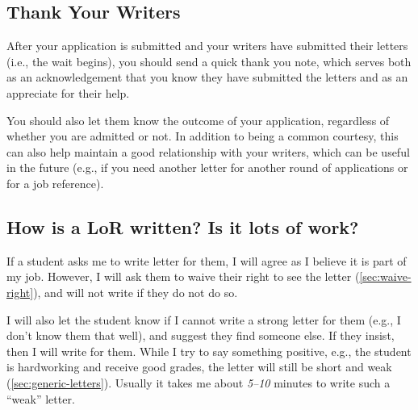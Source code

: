\documentclass[oneside,11pt,dvipsnames]{book}
\newenvironment{commentbox}[1][]{
  \small
  \begin{mybox}
    {\small \textbf{#1}}
  }{
  \end{mybox}
}
\begin{document}
\subsection{Thank Your Writers}\label{sec:thank-writers}
After your application is submitted and your writers have submitted their letters (i.e., the wait begins), you should send a quick thank you note, which serves both as an acknowledgement that you know they have submitted the letters and as an appreciate for their help.  

You should also let them know the outcome of your application, regardless of whether you are admitted or not.  In addition to being a common courtesy, this can also help maintain a good relationship with your writers, which can be useful in the future (e.g., if you need another letter for another round of applications or for a job reference).




\subsection{How is a LoR written? Is it lots of work?}\label{sec:lor-writing}

If a student asks me to write letter for them, I will agree as I believe it is part of my job. However, I will ask them to waive their right to see the letter (\autoref{sec:waive-right}), and will not write if they do not do so.

I will also let the student know if I cannot write a strong letter for them (e.g., I don't know them that well), and suggest they find someone else.  If they insist, then I will write for them. While I try to say something positive, e.g., the student is hardworking and receive good grades, the letter will still be short and weak (\autoref{sec:generic-letters}). Usually it takes me about \emph{5--10} minutes to write such a ``weak'' letter.
\end{document}
